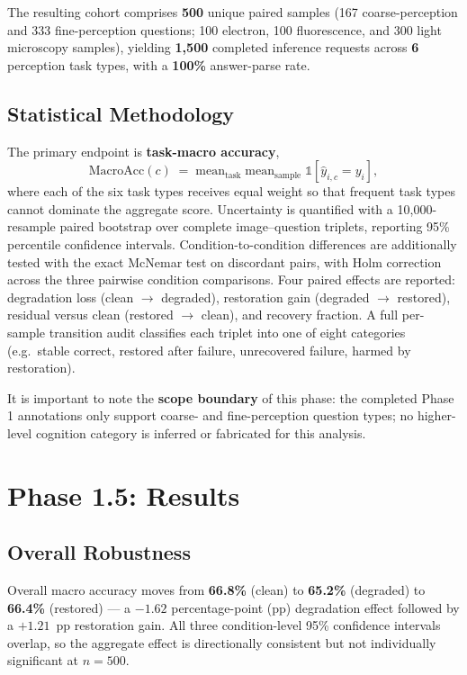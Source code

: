 \documentclass[11pt]{article}
\begin{document}
The resulting cohort comprises \textbf{500} unique paired samples (167 coarse-perception
and 333 fine-perception questions; 100 electron, 100 fluorescence, and 300 light
microscopy samples), yielding \textbf{1{,}500} completed inference requests across
\textbf{6} perception task types, with a \textbf{100\%} answer-parse rate.

\subsection{Statistical Methodology}

The primary endpoint is \textbf{task-macro accuracy},
\[
\mathrm{MacroAcc}(c) \;=\; \mathrm{mean}_{\text{task}}\;\mathrm{mean}_{\text{sample}}\;
\mathbb{1}\!\left[\hat{y}_{i,c} = y_i\right],
\]
where each of the six task types receives equal weight so that frequent task types
cannot dominate the aggregate score. Uncertainty is quantified with a 10{,}000-resample
paired bootstrap over complete image--question triplets, reporting 95\% percentile
confidence intervals. Condition-to-condition differences are additionally tested with
the exact McNemar test on discordant pairs, with Holm correction across the three
pairwise condition comparisons. Four paired effects are reported: degradation loss
(clean $\to$ degraded), restoration gain (degraded $\to$ restored), residual versus
clean (restored $\to$ clean), and recovery fraction. A full per-sample transition audit
classifies each triplet into one of eight categories (e.g.\ stable correct, restored
after failure, unrecovered failure, harmed by restoration).

It is important to note the \textbf{scope boundary} of this phase: the completed Phase 1
annotations only support coarse- and fine-perception question types; no higher-level
cognition category is inferred or fabricated for this analysis.

\section{Phase 1.5: Results}

\subsection{Overall Robustness}

Overall macro accuracy moves from \textbf{66.8\%} (clean) to \textbf{65.2\%} (degraded)
to \textbf{66.4\%} (restored) --- a $-1.62$ percentage-point (pp) degradation effect
followed by a $+1.21$~pp restoration gain. All three condition-level 95\% confidence
intervals overlap, so the aggregate effect is directionally consistent but not
individually significant at $n=500$.
\end{document}
